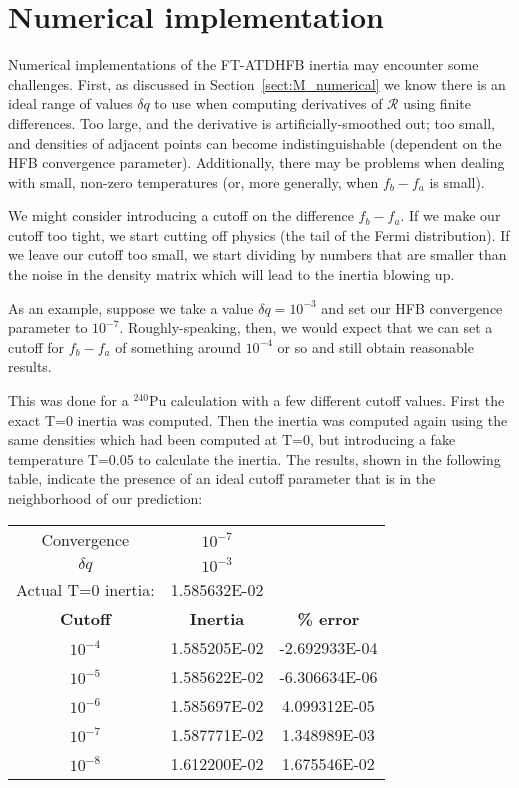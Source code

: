 \section{Numerical implementation}

Numerical implementations of the FT-ATDHFB inertia may encounter some challenges. First,  as discussed in Section~\ref{sect:M_numerical} we know there is an ideal range of values $\delta q$ to use when computing derivatives of $\mathcal{R}$ using finite differences. Too large, and the derivative is artificially-smoothed out; too small, and densities of adjacent points can become indistinguishable (dependent on the HFB convergence parameter). Additionally, there may be problems when dealing with small, non-zero temperatures (or, more generally, when $f_b-f_a$ is small).
%
%

We might consider introducing a cutoff on the difference $f_b-f_a$. If we make our cutoff too tight, we start cutting off physics (the tail of the Fermi distribution). If we leave our cutoff too small, we start dividing by numbers that are smaller than the noise in the density matrix which will lead to the inertia blowing up.

As an example, suppose we take a value $\delta q = 10^{-3}$ and set our HFB convergence parameter to $10^{-7}$. Roughly-speaking, then, we would expect that we can set a cutoff for $f_b-f_a$ of something around $10^{-4}$ or so and still obtain reasonable results.

This was done for a $^{240}$Pu calculation with a few different cutoff values. First the exact T=0 inertia was computed. Then the inertia was computed again using the same densities which had been computed at T=0, but introducing a fake temperature T=0.05 to calculate the inertia. The results, shown in the following table, indicate the presence of an ideal cutoff parameter that is in the neighborhood of our prediction:

\begin{tabular}{|ccc|}
	\hline Convergence & $10^{-7}$ &  \\ 
	$\delta q$ & $10^{-3}$ &  \\ 
	Actual T=0 inertia: & 1.585632E-02 &  \\ \hline
	\textbf{Cutoff} & \textbf{Inertia} & \textbf{\% error} \\ \hline
	$10^{-4}$ & 1.585205E-02 & -2.692933E-04 \\
	$10^{-5}$ & 1.585622E-02 & -6.306634E-06 \\
	$10^{-6}$ & 1.585697E-02 & 4.099312E-05 \\
	$10^{-7}$ & 1.587771E-02 & 1.348989E-03 \\
	$10^{-8}$ & 1.612200E-02 & 1.675546E-02 \\ \hline
\end{tabular} 

